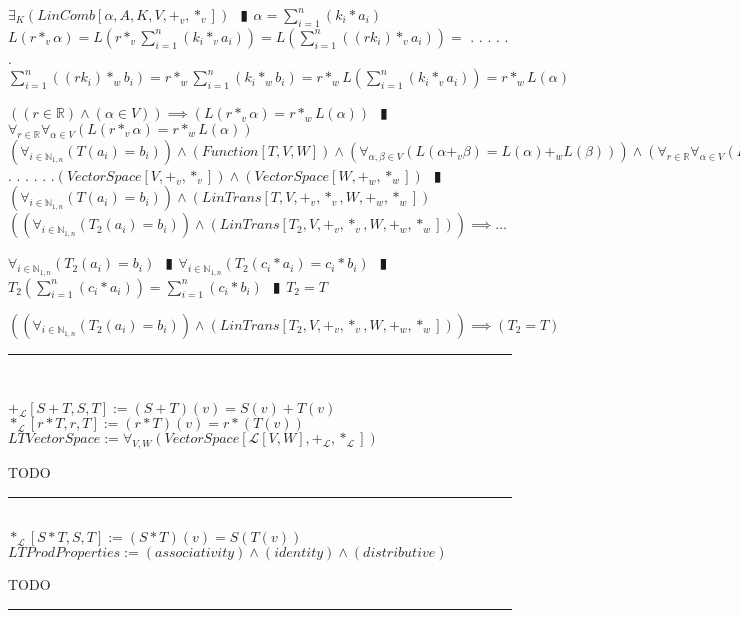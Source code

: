 \documentclass{book}
\newcommand{\abr}{:=}
\newcommand{\cont}{\phantom{.}. . .\phantom{.}}
\newcommand{\pipe}{$\phantom{(}\vrectangleblack\phantom{)}$}
\begin{document}
\begin{enumerate}
  \begin{enumerate}
    \lit $\exists_{K}(LinComb[\alpha, A, K, V, +_v, *_v])$ \pipe $\alpha = \sum_{i = 1}^{n}(k_i * a_i)$
    \lit $L(r *_v \alpha) = L(r *_v \sum_{i = 1}^{n}(k_i *_v a_i)) = L(\sum_{i = 1}^{n}((r k_i) *_v a_i)) = $ \cont
    \lit \cont $\sum_{i = 1}^{n}((r k_i) *_w b_i) = r *_w \sum_{i = 1}^{n}(k_i *_w b_i) = r *_w L(\sum_{i = 1}^{n}(k_i *_v a_i)) = r *_w L(\alpha)$
  \end{enumerate}
  \lit $((r \in \mathbb{R}) \land (\alpha \in V)) \implies (L(r *_v \alpha) = r *_w L(\alpha))$ \pipe $\forall_{r \in \mathbb{R}} \forall_{\alpha \in V}(L(r *_v \alpha) = r *_w L(\alpha))$
  \lit $(\forall_{i \in \mathbb{N}_{1, n}}(T(a_i) = b_i)) \land (Function[T, V, W]) \land (\forall_{\alpha, \beta \in V}(L(\alpha +_v \beta) = L(\alpha) +_w L(\beta))) \land (\forall_{r \in \mathbb{R}} \forall_{\alpha \in V}(L(r *_v \alpha) = r *_w L(\alpha))) \land$ \cont
  \lit \cont $(VectorSpace[V, +_v, *_v]) \land (VectorSpace[W, +_w, *_w])$ \pipe $(\forall_{i \in \mathbb{N}_{1, n}}(T(a_i) = b_i)) \land (LinTrans[T, V, +_v, *_v, W, +_w, *_w])$
  \lit $((\forall_{i \in \mathbb{N}_{1, n}}(T_2(a_i) = b_i)) \land (LinTrans[T_2, V, +_v, *_v, W, +_w, *_w])) \implies \ldots$
  \begin{enumerate}
    \lit $\forall_{i \in \mathbb{N}_{1, n}}(T_2(a_i) = b_i)$ \pipe $\forall_{i \in \mathbb{N}_{1, n}}(T_2(c_i * a_i) = c_i * b_i)$ \pipe $T_2(\sum_{i = 1}^{n}(c_i * a_i)) = \sum_{i = 1}^{n}(c_i * b_i)$ \pipe $T_2 = T$
  \end{enumerate}
  \lit $((\forall_{i \in \mathbb{N}_{1, n}}(T_2(a_i) = b_i)) \land (LinTrans[T_2, V, +_v, *_v, W, +_w, *_w])) \implies (T_2 = T)$
\end{enumerate} \vspace{.75mm} \hrule \vspace{.75mm} \ \\ 

\begin{shaded} %
  $+_\mathcal{L}[S + T, S, T] \abr (S + T)(v) = S(v) + T(v)$ \\
  $*_\mathcal{L}[r * T, r, T] \abr (r * T)(v) = r * (T(v))$ \\
  $LTVectorSpace \abr \forall_{V, W}(VectorSpace[\mathcal{L}[V, W], +_\mathcal{L}, *_\mathcal{L}])$
  \begin{enumerate}
    \lit TODO
  \end{enumerate} \vspace{.75mm} \hrule \vspace{.75mm} \ \\ 

  $*_\mathcal{L}[S * T, S, T] \abr (S * T)(v) = S(T(v))$ \\
  $LTProdProperties \abr (associativity) \land (identity) \land (distributive)$
  \begin{enumerate}
    \lit TODO
  \end{enumerate} \vspace{.75mm} \hrule \vspace{.75mm} \ \\ 
\end{shaded} %
\end{document}

